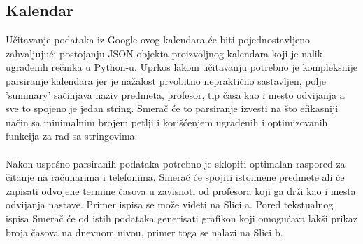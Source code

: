 \documentclass[a4paper,11pt]{article}
\begin{document}
\subsection{Kalendar}
Učitavanje podataka iz Google-ovog kalendara će biti pojednostavljeno zahvaljujući postojanju JSON objekta proizvoljnog kalendara koji je nalik ugrađenih rečnika u Python-u. Uprkos lakom učitavanju potrebno je kompleksnije parsiranje kalendara jer je nažalost prvobitno nepraktično sastavljen, polje 'summary' sačinjava naziv predmeta, profesor, tip časa kao i mesto odvijanja a sve to spojeno je jedan string. Smerač će to parsiranje izvesti na što efikasniji način sa minimalnim brojem petlji i korišćenjem ugrađenih i optimizovanih funkcija za rad sa stringovima.
\\\\
Nakon uspešno parsiranih podataka potrebno je sklopiti optimalan raspored za čitanje na računarima i telefonima. Smerač će spojiti istoimene predmete ali će zapisati odvojene termine časova u zavisnoti od profesora koji ga drži kao i mesta odvijanja nastave. Primer ispisa se može videti na Slici a. Pored tekstualnog ispisa Smerač će od istih podataka generisati grafikon koji omogućava lakši prikaz broja časova na dnevnom nivou, primer toga se nalazi na Slici b.
\begin{figure}[h]
    \centering
    \hspace{1cm}
    \hspace{1cm}
\end{figure}
\newpage
\end{document}
